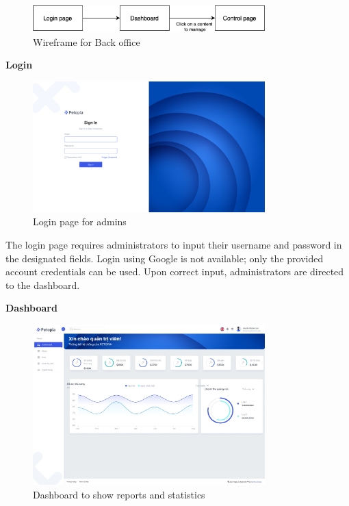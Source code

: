\begin{figure}[H]
    \centering
    \includegraphics[width=0.8\textwidth]{Figures/wireframe_bo.png}
    \caption{Wireframe for Back office}
\end{figure}

\textbf{Login}

\begin{figure}[H]
    \centering
    \includegraphics[width=0.8\textwidth]{Figures/login_bo_ui.png}
    \caption{Login page for admins}
\end{figure}

The login page requires administrators to input their username and password in the designated fields. Login using Google is not available; only the provided account credentials can be used. Upon correct input, administrators are directed to the dashboard.

\textbf{Dashboard}

\begin{figure}[H]
    \centering
    \includegraphics[width=0.8\textwidth]{Figures/dashboard_ui.jpg}
    \caption{Dashboard to show reports and statistics}
\end{figure}

